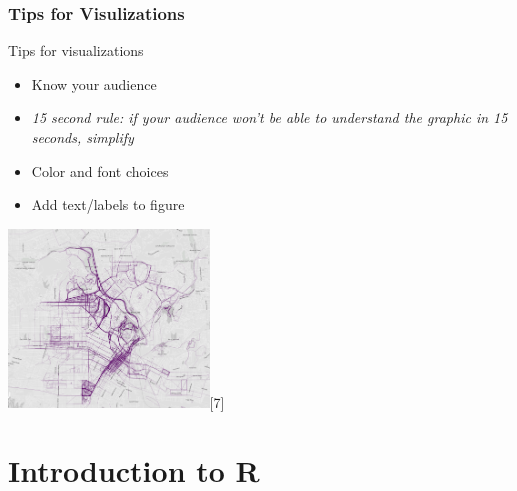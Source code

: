 \section{Tips for Visulizations}
\begin{frame}
	\begin{center}
  		\begin{block}{Tips for visualizations} 
			\begin{itemize}
				\item Know your audience 
				\item \itshape{ 15 second rule:} \normalfont if your audience won't be able to understand the graphic in 15 seconds, simplify
				\item Color and font choices
				\item Add text/labels to figure
			\end{itemize}		
		\end{block}
	\end{center} 

  \begin{center}
  	\includegraphics[width=0.4\textwidth]{images/geolocation_ex2}[7]
  \end{center}

\end{frame}




\part{Introduction to R}

